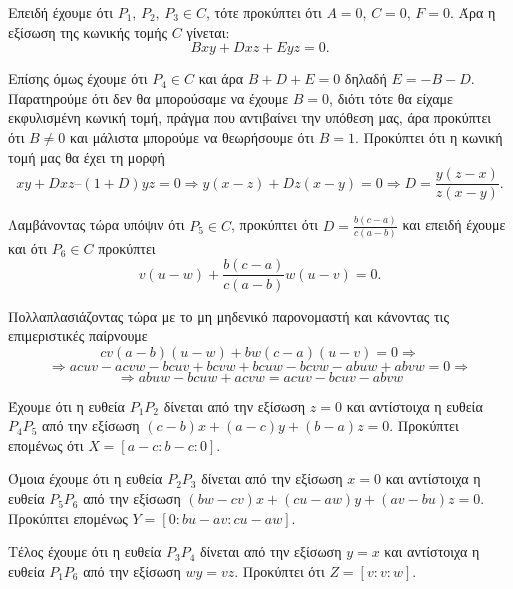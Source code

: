\documentclass[12pt, a4paper]{book}
\begin{document}
Επειδή έχουμε ότι $P_1$, $P_2$, $P_3 \in C$, τότε προκύπτει ότι $A=0$, $C=0$, $F=0$. Άρα η εξίσωση της κωνικής τομής $C$ γίνεται:
\begin{displaymath}
Bxy+Dxz+Eyz=0.
\end{displaymath}

Επίσης όμως έχουμε ότι $P_4 \in C$ και άρα $B+D+E =0$ δηλαδή $E=-B-D$. Παρατηρούμε ότι δεν θα μπορούσαμε να έχουμε $B=0$, διότι τότε θα είχαμε εκφυλισμένη κωνική τομή, πράγμα που αντιβαίνει την υπόθεση μας, άρα προκύπτει ότι $B \neq 0$ και μάλιστα μπορούμε να θεωρήσουμε ότι $B=1$. Προκύπτει ότι η κωνική τομή μας θα έχει τη μορφή
\begin{displaymath}
xy+ Dxz – (1+D)yz=0 \Rightarrow y(x-z) + Dz(x-y)=0 \Rightarrow D= \frac{y(z-x)}{z(x-y)}.
\end{displaymath}

Λαμβάνοντας τώρα υπόψιν ότι $P_5 \in C$, προκύπτει ότι $D= \frac{b(c-a)}{c(a-b)}$ και επειδή έχουμε και ότι $P_6 \in C$ προκύπτει
\begin{displaymath}
v(u-w)+ \frac{b(c-a)}{c(a-b)} w(u-v)=0.
\end{displaymath}

Πολλαπλασιάζοντας τώρα με το μη μηδενικό παρονομαστή και κάνοντας τις επιμεριστικές παίρνουμε
\begin{displaymath}
cv(a-b)(u-w)+bw(c-a)(u-v)=0 \Rightarrow 
\end{displaymath}
\begin{displaymath}
\Rightarrow acuv-acvw-bcuv+bcvw+bcuw-bcvw-abuw+abvw=0 \Rightarrow
\end{displaymath}
\begin{displaymath}
\Rightarrow abuw-bcuw+acvw = acuv - bcuv - abvw
\end{displaymath}

Έχουμε ότι η ευθεία $P_1P_2$ δίνεται από την εξίσωση $z=0$ και αντίστοιχα η ευθεία  $P_4P_5$ από την εξίσωση $(c-b)x +(a-c)y+(b-a)z =0$. Προκύπτει επομένως ότι $X = [a-c:b-c:0]$.

Όμοια έχουμε ότι η ευθεία $P_2P_3$ δίνεται από την εξίσωση $x=0$ και αντίστοιχα η ευθεία $P_5P_6$ από την εξίσωση $(bw-cv)x+(cu-aw)y+(av-bu)z=0$. Προκύπτει επομένως $Y=[0:bu-av:cu-aw]$.

Τέλος έχουμε ότι η ευθεία $P_3P_4$ δίνεται από την εξίσωση $y=x$ και αντίστοιχα η ευθεία $P_1P_6$ από την εξίσωση $wy = vz$. Προκύπτει ότι $Z=[v:v:w]$.
\end{document}
